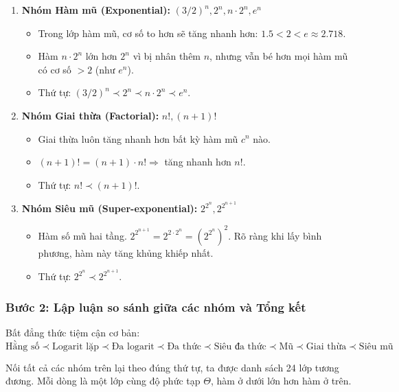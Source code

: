 \documentclass[12pt,a4paper]{article}
\begin{document}
\begin{enumerate}[label=\textbf{\arabic*.}]
    \item \textbf{Nhóm Hàm mũ (Exponential):} $(3/2)^n, 2^n, n \cdot 2^n, e^n$
    \begin{itemize}[noitemsep]
        \item Trong lớp hàm mũ, cơ số to hơn sẽ tăng nhanh hơn: $1.5 < 2 < e \approx 2.718$.
        \item Hàm $n \cdot 2^n$ lớn hơn $2^n$ vì bị nhân thêm $n$, nhưng vẫn bé hơn mọi hàm mũ có cơ số $>2$ (như $e^n$).
        \item Thứ tự: $(3/2)^n \prec 2^n \prec n \cdot 2^n \prec e^n$.
    \end{itemize}

    \item \textbf{Nhóm Giai thừa (Factorial):} $n!, (n+1)!$
    \begin{itemize}[noitemsep]
        \item Giai thừa luôn tăng nhanh hơn bất kỳ hàm mũ $c^n$ nào.
        \item $(n+1)! = (n+1) \cdot n! \Longrightarrow$ tăng nhanh hơn $n!$.
        \item Thứ tự: $n! \prec (n+1)!$.
    \end{itemize}

    \item \textbf{Nhóm Siêu mũ (Super-exponential):} $2^{2^n}, 2^{2^{n+1}}$
    \begin{itemize}[noitemsep]
        \item Hàm số mũ hai tầng. $2^{2^{n+1}} = 2^{2 \cdot 2^n} = (2^{2^n})^2$. Rõ ràng khi lấy bình phương, hàm này tăng khủng khiếp nhất.
        \item Thứ tự: $2^{2^n} \prec 2^{2^{n+1}}$.
    \end{itemize}

\end{enumerate}

\subsubsection*{Bước 2: Lập luận so sánh giữa các nhóm và Tổng kết}

Bất đẳng thức tiệm cận cơ bản:
\[
    \text{Hằng số} \prec \text{Logarit lặp} \prec \text{Đa logarit} \prec \text{Đa thức} \prec \text{Siêu đa thức} \prec \text{Mũ} \prec \text{Giai thừa} \prec \text{Siêu mũ}
\]

Nối tất cả các nhóm trên lại theo đúng thứ tự, ta được danh sách 24 lớp tương đương. Mỗi dòng là một lớp cùng độ phức tạp $\Theta$, hàm ở dưới lớn hơn hàm ở trên.
\end{document}
